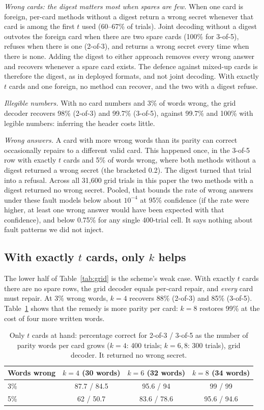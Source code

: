 \documentclass[numeric]{anvil-paper}
\begin{document}
\emph{Wrong cards: the digest matters most when spares are few.} When one
card is foreign, per-card methods without a digest return a wrong secret
whenever that card is among the first $t$ used (60--67\% of trials). Joint
decoding without a digest outvotes the foreign card when there are two spare
cards (100\% for 3-of-5), refuses when there is one (2-of-3), and returns a
wrong secret every time when there is none. Adding the digest to either
approach removes every wrong answer and recovers whenever a spare card
exists. The defence against mixed-up cards is therefore the digest, as in
deployed formats, and not joint decoding. With exactly $t$ cards and one
foreign, no method can recover, and the two with a digest refuse.

\emph{Illegible numbers.} With no card numbers and 3\% of words wrong, the grid
decoder recovers 98\% (2-of-3) and 99.7\% (3-of-5), against 99.7\% and
100\% with legible numbers: inferring the header costs little.

\emph{Wrong answers.} A card with more wrong words than its parity can
correct occasionally repairs to a different valid card. This happened once,
in the 3-of-5 row with exactly $t$ cards and 5\% of words wrong, where both
methods without a digest returned a wrong secret (the bracketed 0.2). The digest
turned that trial into a refusal. Across all 31{,}600 grid trials in this paper the two
methods with a digest returned no wrong secret. Pooled, that bounds the rate of
wrong answers under these fault models below about $10^{-4}$ at 95\% confidence
(if the rate were higher, at least one wrong answer would have been
expected with that confidence), and below 0.75\% for any single 400-trial cell. It says
nothing about fault patterns we did not inject.

\subsection{With exactly $t$ cards, only $k$ helps}

The lower half of Table~\ref{tab:grid} is the scheme's weak case. With exactly
$t$ cards there are no spare rows, the grid decoder equals per-card repair, and
\emph{every} card must repair. At 3\% wrong words, $k=4$ recovers 88\% (2-of-3)
and 85\% (3-of-5). Table~\ref{tab:k} shows that the remedy is more parity per
card: $k=8$ restores 99\% at the cost of four more written words.

\begin{table}[!htb]
\centering
\caption{Only $t$ cards at hand: percentage correct for 2-of-3 / 3-of-5 as the
number of parity words per card grows ($k=4$: 400 trials; $k=6,8$: 300
trials), grid decoder. It returned no wrong secret.}
\label{tab:k}
\small
\begin{tabular}{lccc}
\toprule
Words wrong & $k=4$ (30 words) & $k=6$ (32 words) & $k=8$ (34 words) \\
\midrule
3\% & 87.7 / 84.5 & 95.6 / 94 & 99 / 99 \\
5\% & 62 / 50.7 & 83.6 / 78.6 & 95.6 / 94.6 \\
\bottomrule
\end{tabular}
\end{table}
\end{document}
